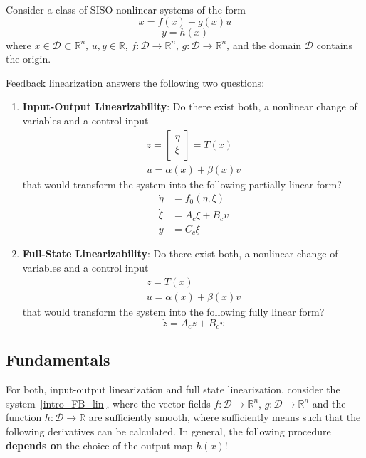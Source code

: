 Consider a class of SISO nonlinear systems of the form
\begin{equation*}
    \dot{x} = f(x) + g(x)u
\end{equation*}
\begin{equation*}
    y = h(x)
\end{equation*}
where $x \in \mathcal{D} \subset \mathbb{R}^n$, $u, y \in \mathbb{R}$, $f: \mathcal{D} \to \mathbb{R}^n$, $g: \mathcal{D} \to \mathbb{R}^n$, and the domain $\mathcal{D}$ contains the origin.

\newpar{}
Feedback linearization answers the following two questions:
\newpar{}
\begin{enumerate}
    \item \textbf{Input-Output Linearizability}: Do there exist both, a nonlinear change of variables and a control input
          \begin{gather*}
              z = \begin{bmatrix} \eta \\ \xi \end{bmatrix} = T(x)\\
              u = \alpha(x) + \beta(x)v
          \end{gather*}
          that would transform the system into the following partially linear form?
          \begin{align*}
              \dot{\eta} & = f_0(\eta, \xi) \\
              \dot{\xi}  & = A_c\xi + B_cv  \\
              y          & = C_c\xi
          \end{align*}
    \item \textbf{Full-State Linearizability}:
          Do there exist both, a nonlinear change of variables and a control input
          \begin{gather*}
              z = T(x)\\
              u = \alpha(x) + \beta(x)v
          \end{gather*}
          that would transform the system into the following fully linear form?
          \begin{equation*}
              \dot{z} = A_c z + B_c v
          \end{equation*}
\end{enumerate}

\subsection{Fundamentals}
For both, input-output linearization and full state linearization, consider the system~\ref{intro_FB_lin}, where the vector fields $f: \mathcal{D} \to \mathbb{R}^n$, $g: \mathcal{D} \to \mathbb{R}^n$ and the function $h: \mathcal{D} \to \mathbb{R}$ are sufficiently smooth, where sufficiently means such that the following derivatives can be calculated.
\newpar{}
In general, the following procedure \textbf{depends on} the choice of the output map $h(x)$!

